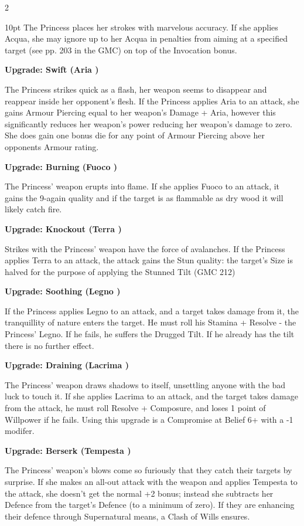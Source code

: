 \begin{multicols}{2}
\begin{myindentpar}{10pt}
The Princess places her strokes with marvelous accuracy. If she applies Acqua, she may ignore up to her Acqua in penalties from aiming at a specified target (see pp. 203 in the GMC) on top of the Invocation bonus.

\textbf{Upgrade: Swift (Aria \textbullet\textbullet)}

The Princess strikes quick as a flash, her weapon seems to disappear and reappear inside her opponent's flesh. If the Princess applies Aria to an attack, she gains Armour Piercing equal to her weapon's Damage + Aria, however this significantly reduces her weapon's power reducing her weapon's damage to zero. She does gain one bonus die for any point of Armour Piercing above her opponents Armour rating. 

\textbf{Upgrade: Burning (Fuoco \textbullet\textbullet)}

The Princess' weapon erupts into flame. If she applies Fuoco to an attack, it gains the 9-again quality and if the target is as flammable as dry wood it will likely catch fire. 

\textbf{Upgrade: Knockout (Terra \textbullet\textbullet)}

Strikes with the Princess' weapon have the force of avalanches. If the Princess applies Terra to an attack, the attack gains the Stun quality: the target's Size is halved for the purpose of applying the Stunned Tilt (GMC 212)

\textbf{Upgrade: Soothing (Legno \textbullet\textbullet)}

If the Princess applies Legno to an attack, and a target takes damage from it, the tranquillity of nature enters the target. He must roll his Stamina + Resolve - the Princess' Legno. If he fails, he suffers the Drugged Tilt. If he already has the tilt there is no further effect. 

\textbf{Upgrade: Draining (Lacrima \textbullet\textbullet)}

The Princess' weapon draws shadows to itself, unsettling anyone with the bad luck to touch it. If she applies Lacrima to an attack, and the target takes damage from the attack, he must roll Resolve + Composure, and loses 1 point of Willpower if he fails. Using this upgrade is a Compromise at Belief 6+ with a -1 modifer.

\textbf{Upgrade: Berserk (Tempesta \textbullet\textbullet)}

The Princess' weapon's blows come so furiously that they catch their targets by surprise. If she makes an all-out attack with the weapon and applies Tempesta to the attack, she doesn't get the normal +2 bonus; instead she subtracts her Defence from the target's Defence (to a minimum of zero). If they are enhancing their defence through Supernatural means, a Clash of Wills ensures.\end{myindentpar}



\end{multicols}
